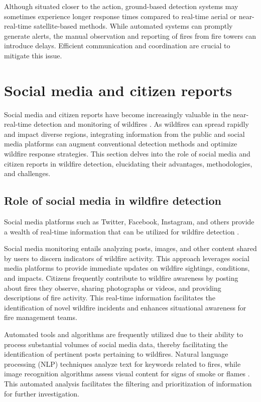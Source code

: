 \documentclass[
  12 pt,
]{Nemilov}
\begin{document}
Although situated closer to the action, ground-based detection systems may sometimes experience longer response times compared to real-time aerial or near-real-time satellite-based methods. While automated systems can promptly generate alerts, the manual observation and reporting of fires from fire towers can introduce delays. Efficient communication and coordination are crucial to mitigate this issue.

\section{Social media and citizen reports}\label{social-media-and-citizen-reports}

Social media and citizen reports have become increasingly valuable in the near-real-time detection and monitoring of wildfires \citep{slavkovikj2014review}. As wildfires can spread rapidly and impact diverse regions, integrating information from the public and social media platforms can augment conventional detection methods and optimize wildfire response strategies. This section delves into the role of social media and citizen reports in wildfire detection, elucidating their advantages, methodologies, and challenges.

\subsection{Role of social media in wildfire detection}\label{role-of-social-media-in-wildfire-detection}

Social media platforms such as Twitter, Facebook, Instagram, and others provide a wealth of real-time information that can be utilized for wildfire detection \citep{lei2018can, slavkovikj2014review}.

Social media monitoring entails analyzing posts, images, and other content shared by users to discern indicators of wildfire activity. This approach leverages social media platforms to provide immediate updates on wildfire sightings, conditions, and impacts. Citizens frequently contribute to wildfire awareness by posting about fires they observe, sharing photographs or videos, and providing descriptions of fire activity. This real-time information facilitates the identification of novel wildfire incidents and enhances situational awareness for fire management teams.

Automated tools and algorithms are frequently utilized due to their ability to process substantial volumes of social media data, thereby facilitating the identification of pertinent posts pertaining to wildfires. Natural language processing (NLP) techniques analyze text for keywords related to fires, while image recognition algorithms assess visual content for signs of smoke or flames \citep{khurana2023natural, ma2024surveying}. This automated analysis facilitates the filtering and prioritization of information for further investigation.
\end{document}
